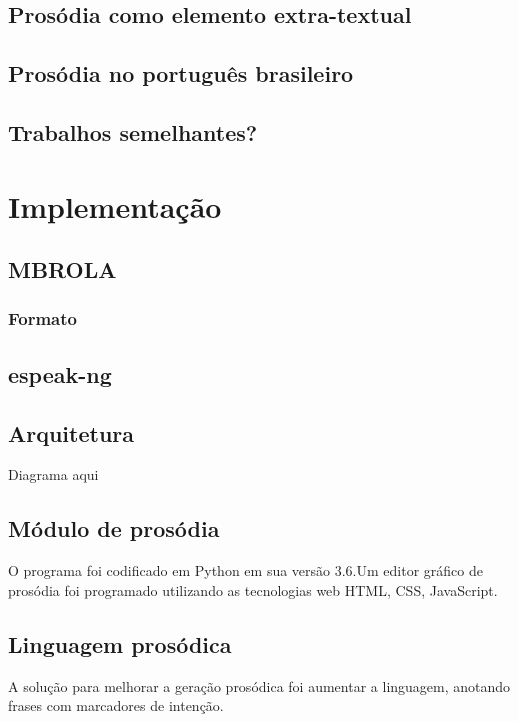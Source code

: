 \subsection{Prosódia como elemento extra-textual}
\subsection{Prosódia no português brasileiro}
\subsection{Trabalhos semelhantes?}

\section{Implementação}
\subsection{MBROLA}
\subsubsection{Formato}
\subsection{espeak-ng}
\subsection{Arquitetura}
Diagrama aqui
\subsection{Módulo de prosódia}
O programa foi codificado em Python em sua versão 3.6.Um editor gráfico de
prosódia foi programado utilizando as tecnologias web HTML, CSS, JavaScript.
\subsection{Linguagem prosódica}
A solução para melhorar a geração prosódica foi aumentar a linguagem, anotando
frases com marcadores de intenção.


